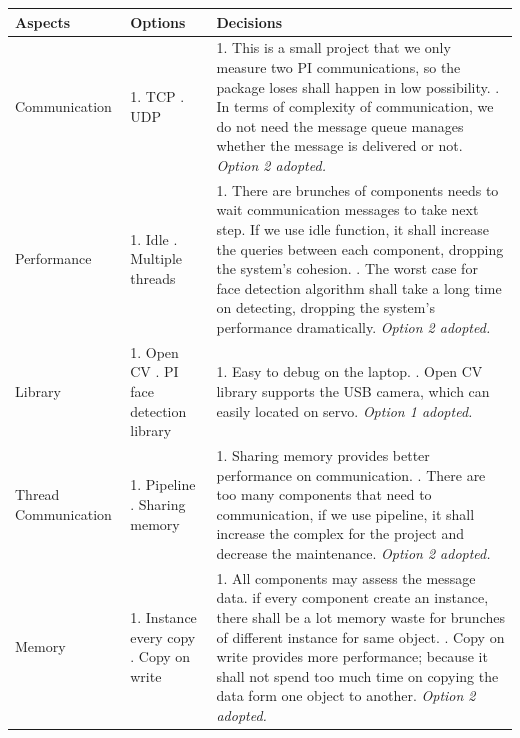 \documentclass[11pt,a4paper,titlepage]{report}
\begin{document}
\begin{center}
\begin{table}
\begin{tabular}{|p{}|p{}|p{}|}
    \hline
    \textbf{Aspects} & \textbf{Options} & \textbf{Decisions} \\ \hline
    
     Communication & 1. TCP \newline 2. UDP & 1. This is a small project that we only measure two PI communications, so the package loses shall happen in low possibility. \newline  2. In terms of complexity of communication, we do not need the message queue manages whether the message is delivered or not. \newline \textit{Option 2 adopted.
} \\ \hline

     Performance & 1. Idle \newline 2. Multiple threads & 1. There are brunches of components needs to wait communication messages to take next step. If we use idle function, it shall increase the queries between each component, dropping the system's cohesion. \newline  2. The worst case for face detection algorithm shall take a long time on detecting, dropping the system’s performance dramatically. \newline \textit{Option 2 adopted.
} \\ \hline

     Library & 1. Open CV \newline 2. PI face detection library & 1. Easy to debug on the laptop. \newline  2. Open CV library supports the USB camera, which can easily located on servo. \newline \textit{Option 1 adopted.
} \\ \hline
     
     Thread Communication & 1. Pipeline \newline 2. Sharing memory & 1. Sharing memory provides better performance on communication. \newline  2. There are too many components that need to communication, if we use pipeline, it shall increase the complex for the project and decrease the maintenance. \newline \textit{Option 2 adopted.
} \\ \hline
     
     Memory & 1. Instance every copy
 \newline 2. Copy on write & 1. All components may assess the message data. if every component create an instance, there shall be a lot memory waste for brunches of different instance for same object.
 \newline  2. Copy on write provides more performance; because it shall not spend too much time on copying the data form one object to another. \newline \textit{Option 2 adopted.
} \\ \hline


\end{tabular}
\end{table}
\end{center}
\end{document}
